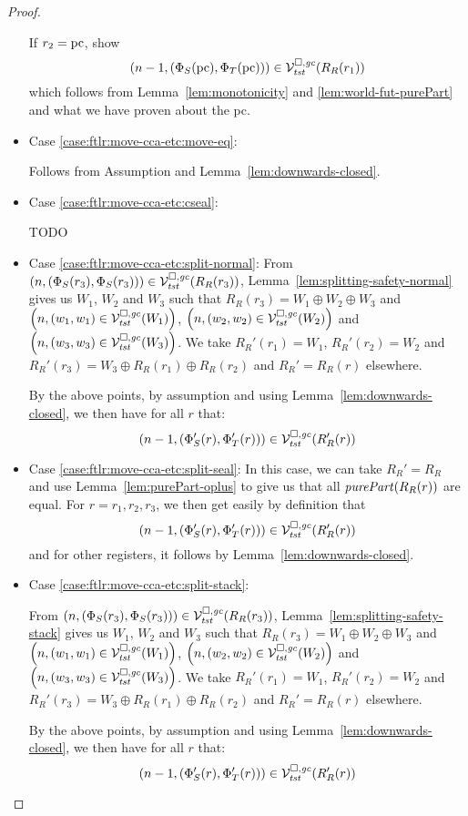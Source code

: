 \begin{proof}
\begin{itemize}
    If $r_2 = \pcreg$, show
    \[
      \npair[n-1]{(\Phi_S(\pcreg),\Phi_T(\pcreg))} \in \lrvg{\trust}(R_R(r_1))
    \]
    which follows from Lemma~\ref{lem:monotonicity} and \ref{lem:world-fut-purePart} and what we have proven about the pc.
  \item Case \ref{case:ftlr:move-cca-etc:move-eq}:
    
    Follows from Assumption and Lemma~\ref{lem:downwards-closed}.

  \item Case \ref{case:ftlr:move-cca-etc:cseal}:

    TODO
  \item Case \ref{case:ftlr:move-cca-etc:split-normal}:
    From $\npair{(\Phi_S(r_3),\Phi_S(r_3))} \in \lrvg{\trust}(R_R(r_3))$, Lemma~\ref{lem:splitting-safety-normal} gives us $W_1$, $W_2$ and $W_3$ such that $R_R(r_3) = W_1 \oplus W_2 \oplus W_3$ and $\npair{(w_1,w_1) \in \lrvg{\trust}(W_1)}$, $\npair{(w_2,w_2) \in \lrvg{\trust}(W_2)}$ and $\npair{(w_3,w_3) \in \lrvg{\trust}(W_3)}$.
    We take $R_R'(r_1) = W_1$, $R_R'(r_2) = W_2$ and $R_R'(r_3) = W_3 \oplus R_R(r_1) \oplus R_R(r_2)$ and $R_R' = R_R(r)$ elsewhere.

    By the above points, by assumption and using Lemma~\ref{lem:downwards-closed}, we then have for all $r$ that:
    \[
      \npair[n-1]{(\Phi_S'(r), \Phi_T'(r))} \in \lrvg{\trust}(R_R'(r))
    \]
  \item Case \ref{case:ftlr:move-cca-etc:split-seal}:
    In this case, we can take $R_R' = R_R$ and use Lemma~\ref{lem:purePart-oplus} to give us that all $\purePart{R_R(r)}$ are equal.
    For $r = r_1, r_2, r_3$, we then get easily by definition that
    \[
      \npair[n-1]{(\Phi_S'(r), \Phi_T'(r))} \in \lrvg{\trust}(R_R'(r))
    \]
    and for other registers, it follows by Lemma~\ref{lem:downwards-closed}.

  \item Case \ref{case:ftlr:move-cca-etc:split-stack}:

    From $\npair{(\Phi_S(r_3),\Phi_S(r_3))} \in \lrvg{\trust}(R_R(r_3))$, Lemma~\ref{lem:splitting-safety-stack} gives us $W_1$, $W_2$ and $W_3$ such that $R_R(r_3) = W_1 \oplus W_2 \oplus W_3$ and $\npair{(w_1,w_1) \in \lrvg{\trust}(W_1)}$, $\npair{(w_2,w_2) \in \lrvg{\trust}(W_2)}$ and $\npair{(w_3,w_3) \in \lrvg{\trust}(W_3)}$.
    We take $R_R'(r_1) = W_1$, $R_R'(r_2) = W_2$ and $R_R'(r_3) = W_3 \oplus R_R(r_1) \oplus R_R(r_2)$ and $R_R' = R_R(r)$ elsewhere.

    By the above points, by assumption and using Lemma~\ref{lem:downwards-closed}, we then have for all $r$ that:
    \[
      \npair[n-1]{(\Phi_S'(r), \Phi_T'(r))} \in \lrvg{\trust}(R_R'(r))
    \]


\end{itemize}
\end{proof}
